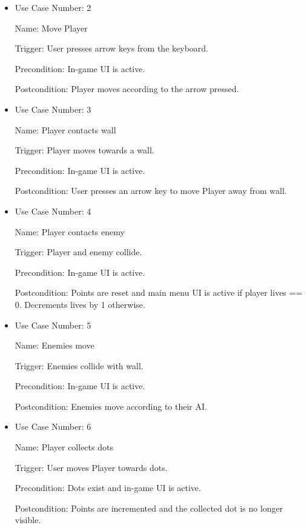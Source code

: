 \documentclass[12pt, titlepage]{article}
\begin{document}
\begin{itemize}
\item
Use Case Number: 2

Name: Move Player

Trigger: User presses arrow keys from the keyboard.

Precondition: In-game UI is active.

Postcondition: Player moves according to the arrow pressed.
\end{itemize}

\begin{itemize}
\item
Use Case Number: 3

Name: Player contacts wall

Trigger: Player moves towards a wall.

Precondition: In-game UI is active.

Postcondition: User presses an arrow key to move Player away from wall.

\end{itemize}

\begin{itemize}
\item
Use Case Number: 4

Name: Player contacts enemy

Trigger: Player and enemy collide.

Precondition: In-game UI is active.

Postcondition: Points are reset and main menu UI is active if player lives == 0. Decrements lives by 1 otherwise.
\end{itemize}

\begin{itemize}
\item
Use Case Number: 5

Name: Enemies move

Trigger: Enemies collide with wall.

Precondition: In-game UI is active.

Postcondition: Enemies move according to their AI.
\end{itemize}

\begin{itemize}
\item
Use Case Number: 6

Name: Player collects dots

Trigger: User moves Player towards dots.

Precondition: Dots exist and in-game UI is active.

Postcondition: Points are incremented and the collected dot is no longer visible.
\end{itemize}
\end{document}
